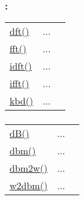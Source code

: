 \subsubsection*{: }

\textcolor{blue}{}\begin{tabular}{>{\raggedleft}p{3cm}>{\centering}p{0.5cm}l}
\textcolor{blue}{\hyperlink{dft}{dft()}}&
...&
 \begin{NoHyper} \nameref{par:Discrete-Fourier-Transform} \end{NoHyper}\tabularnewline
\textcolor{blue}{\hyperlink{fft}{fft()}}&
...&
 \begin{NoHyper} \nameref{par:Fast-Fourier-Transform} \end{NoHyper}\tabularnewline
\textcolor{blue}{\hyperlink{idft}{idft()}}&
...&
 \begin{NoHyper} \nameref{par:Inverse-Discrete-Fourier} \end{NoHyper}\tabularnewline
\textcolor{blue}{\hyperlink{ifft}{ifft()}}&
...&
 \begin{NoHyper} \nameref{par:Inverse-Fast-Fourier} \end{NoHyper}\tabularnewline
\textcolor{blue}{\hyperlink{kbd}{kbd()}}&
...&
 \begin{NoHyper} \nameref{par:Kaiser-Bessel-window} \end{NoHyper}\tabularnewline
\end{tabular}




\subsubsection*{}

\textcolor{blue}{}\begin{tabular}{>{\raggedleft}p{3cm}>{\centering}p{0.5cm}l}
\textcolor{blue}{\hyperlink{dB}{dB()}}&
...&
 \begin{NoHyper} \nameref{par:dB} \end{NoHyper}\tabularnewline
\textcolor{blue}{\hyperlink{dbm}{dbm()}}&
...&
 \begin{NoHyper} \nameref{par:dbm} \end{NoHyper}\tabularnewline
\textcolor{blue}{\hyperlink{dbm2w}{dbm2w()}}&
...&
 \begin{NoHyper} \nameref{par:dbm2w} \end{NoHyper}\tabularnewline
\textcolor{blue}{\hyperlink{w2dbm}{w2dbm()}}&
...&
 \begin{NoHyper} \nameref{par:w2dbm} \end{NoHyper}\tabularnewline
\end{tabular}


